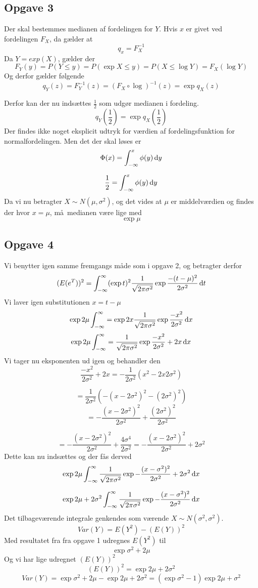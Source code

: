 \subsection*{Opgave 3}

Der skal bestemmes medianen af fordelingen for $Y$. Hvis $x$ er givet ved fordelingen $F_{X}$, da g\ae lder at
\[
q_x = F_{X}^{-1}
\]
Da $Y = exp(X)$, g\ae lder der
\[
F_{Y}(y) = P(Y \leq y) = P(\exp{X} \leq y) = P(X \leq \log{Y}) = F_{X}(\log{Y})
\]
Og derfor g\ae lder f\o lgende
\[
q_{Y}(z) = F_{Y}^{-1}(z) = (F_{X} \circ \log)^{-1}(z) = \exp{q_{X}(z)} 
\]

Derfor kan der nu inds\ae ttes $\frac{1}{2}$ som udg\o r medianen i fordeling.
\[
q_{Y}(\frac{1}{2}) = \exp{q_{X}(\frac{1}{2})}
\]
Der findes ikke noget eksplicit udtryk for v\ae rdien af fordelingsfunktion for normalfordelingen. Men det der skal l\o ses er
\[
\Phi (x) = \int_{-\infty}^{x} \phi (y) \, \mathrm{d} y
\]

\[
\frac{1}{2} = \int_{-\infty}^{x} \phi(y) \, \mathrm{d} y
\]
Da vi nu betragter $X \sim N(\mu, \sigma^2)$, og det vides at $\mu$ er middelv\ae rdien og findes der hvor $x = \mu$, m\aa\ medianen v\ae re lige med
\[
\exp{\mu}
\]

\subsection*{Opgave 4}

Vi benytter igen samme fremgangs m\aa de som i opgave 2, og betragter derfor
\[
(E(e^{T}))^2 = \int_{-\infty}^{\infty} (\exp{t})^{2} \frac{1}{\sqrt{2\pi\sigma^{2}}} \exp{\frac{-(t - \mu)^{2}}{2\sigma^{2}}} \, \mathrm{d} t
\]
Vi laver igen substitutionen $x = t - \mu$
\[
\exp{2\mu} \int_{-\infty}^{\infty} = \exp{2x} \frac{1}{\sqrt{2\pi\sigma^{2}}} \exp{\frac{-x^{2}}{2\sigma^{2}}} \, \mathrm{d} x
\]
\[
\exp{2\mu} \int_{-\infty}^{\infty} = \frac{1}{\sqrt{2\pi\sigma^{2}}} \exp{\frac{-x^{2}}{2\sigma^{2}}+2x} \, \mathrm{d} x
\]
Vi tager nu eksponenten ud igen og behandler den
\[
\frac{-x^{2}}{2\sigma^{2}}+2x = -\frac{1}{2\sigma^2}\left( x^2 - 2x2\sigma^2 \right)
\]

\[
= \frac{1}{2\sigma^2}\left( -\left(x - 2\sigma^2 \right)^2 - \left( 2\sigma^2 \right)^2 \right)
\]
\[
= -\frac{(x - 2\sigma^2)^2}{2\sigma^2} + \frac{(2\sigma^2)^2}{2\sigma^2}
\]

\[
= -\frac{(x - 2\sigma^2)^2}{2\sigma^2} + \frac{4\sigma^4}{2\sigma^2} = -\frac{(x-2\sigma^2)^2}{2\sigma^2} + 2\sigma^2
\]
Dette kan nu inds\ae ttes og der f\aa s derved
\[
\exp{2\mu} \int_{-\infty}^{\infty} \frac{1}{\sqrt{2\pi\sigma^{2}}} \exp{-\frac{(x-\sigma^2)^2}{2\sigma^2} + 2\sigma^2} \, \mathrm{d} x
\]

\[
\exp{2\mu+2\sigma^2} \int_{-\infty}^{\infty} \frac{1}{\sqrt{2\pi\sigma^{2}}} \exp{-\frac{(x-\sigma^2)^2}{2\sigma^2}} \, \mathrm{d} x
\]
Det tilbagev\ae rende integrale genkendes som v\ae rende $X \sim N(\sigma^2, \sigma^2)$.
\[
Var(Y) = E(Y^2) - (E(Y))^2
\]
Med resultatet fra fra opgave 1 udregnes $E(Y^2)$ til 
\[
\exp{\sigma^2 + 2\mu}
\]
Og vi har lige udregnet $(E(Y))^2$
\[
(E(Y))^2 = \exp{2\mu+2\sigma^2}
\]
\[
Var(Y) = \exp{\sigma^2 + 2\mu} - \exp{2\mu+2\sigma^2} = (\exp{\sigma^2} - 1)\exp{2\mu + \sigma^2}
\]
